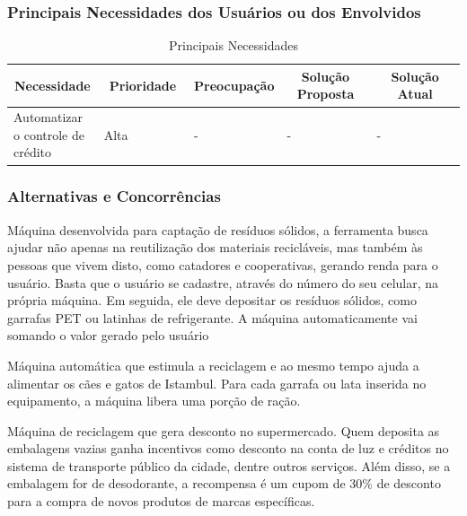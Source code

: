\begin{apendicesenv}
\subsubsection{Principais Necessidades dos Usuários ou dos Envolvidos}

\begin{table}[htp]
    \centering
    \caption{Principais Necessidades}
    \label{my-label}
    \begin{tabular}{|p{0.20\linewidth}|p{0.20\linewidth}|p{0.20\linewidth}|p{0.20\linewidth}|p{0.20\linewidth}|}
    \hline
    \multicolumn{1}{|c|}{\textbf{Necessidade}} & \multicolumn{1}{c|}{\textbf{Prioridade}} & \multicolumn{1}{c|}{\textbf{Preocupação}} & \multicolumn{1}{c|}{\textbf{Solução Proposta}} & \multicolumn{1}{c|}{\textbf{Solução Atual}} \\ \hline
    Automatizar o controle de crédito          & Alta                                     & -                                         & -                                              & -                                           \\ \hline
    \end{tabular}
\end{table}

\subsubsection{Alternativas e Concorrências}

Máquina desenvolvida para captação de resíduos sólidos, a ferramenta busca ajudar não apenas na reutilização dos materiais recicláveis, mas também às pessoas que vivem disto, como catadores e cooperativas, gerando renda para o usuário. Basta que o usuário se cadastre, através do número do seu celular, na própria máquina. Em seguida, ele deve depositar os resíduos sólidos, como garrafas PET ou latinhas de refrigerante. A máquina automaticamente vai somando o valor gerado pelo usuário

Máquina automática que estimula a reciclagem e ao mesmo tempo ajuda a alimentar os cães e gatos de Istambul. Para cada garrafa ou lata inserida no equipamento, a máquina libera uma porção de ração.

Máquina de reciclagem que gera desconto no supermercado. Quem deposita as embalagens vazias ganha incentivos como desconto na conta de luz e créditos no sistema de transporte público da cidade, dentre outros serviços. Além disso, se a embalagem for de desodorante, a recompensa é um cupom de 30\% de desconto para a compra de novos produtos de marcas específicas.


\end{apendicesenv}

